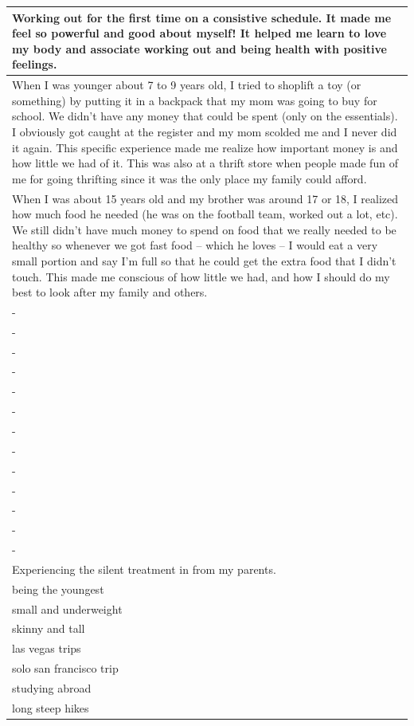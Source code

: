 \documentclass[
  .7em,
  letterpaper,
  DIV=11,
  numbers=noendperiod]{scrartcl}
\begin{document}
\begin{table}
\begin{tabular}{l}
\hline
Working out for the first time on a consistive schedule. It made me feel so powerful and good about myself! It helped me learn to love my body and associate working out and being health with positive feelings.\\
\hline
When I was younger about 7 to 9 years old, I tried to shoplift a toy (or something) by putting it in a backpack that my mom was going to buy for school. We didn't have any money that could be spent (only on the essentials). I obviously got caught at the register and my mom scolded me and I never did it again. This specific experience made me realize how important money is and how little we had of it. This was also at a thrift store when people made fun of me for going thrifting since it was the only place my family could afford.\\
\hline
When I was about 15 years old and my brother was around 17 or 18, I realized how much food he needed (he was on the football team, worked out a lot, etc). We still didn't have much money to spend on food that we really needed to be healthy so whenever we got fast food -- which he loves -- I would eat a very small portion and say I'm full so that he could get the extra food that I didn't touch. This made me conscious of how little we had, and how I should do my best to look after my family and others.\\
\hline
-\\
\hline
-\\
\hline
-\\
\hline
-\\
\hline
-\\
\hline
-\\
\hline
-\\
\hline
-\\
\hline
-\\
\hline
-\\
\hline
-\\
\hline
-\\
\hline
-\\
\hline
Experiencing the silent treatment in from my parents.\\
\hline
being the youngest\\
\hline
small and underweight\\
\hline
skinny and tall\\
\hline
las vegas trips\\
\hline
solo san francisco trip\\
\hline
studying abroad\\
\hline
long steep hikes\\

\end{tabular}
\end{table}
\end{document}
